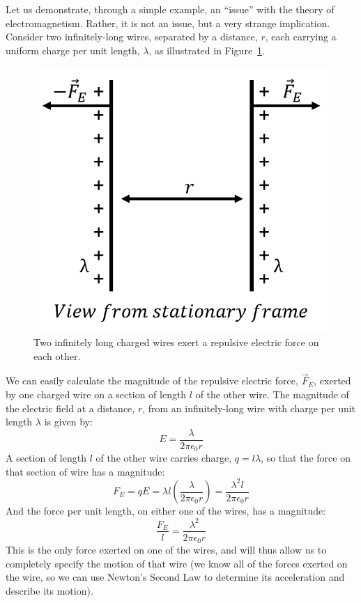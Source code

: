 Let us demonstrate, through a simple example, an ``issue'' with the theory of electromagnetism. Rather, it is not an issue, but a very strange implication. Consider two infinitely-long wires, separated by a distance, $r$, each carrying a uniform charge per unit length, $\lambda$, as illustrated in Figure~\ref{fig:specialrelativity:twowire_electric}.

\begin{figure}[!htbp]
\centering
\includegraphics[width=0.4\linewidth]{files/twowire_electric-36eb50bad6978cca806e4c1857084eb6.png}
\caption[]{Two infinitely long charged wires exert a repulsive electric force on each other.}
\label{fig:specialrelativity:twowire_electric}
\end{figure}

We can easily calculate the magnitude of the repulsive electric force, $\vec F_E$, exerted by one charged wire on a section of length $l$ of the other wire. The magnitude of the electric field at a distance, $r$, from an infinitely-long wire with charge per unit length $\lambda$ is given by:
\begin{equation}
E = \frac{\lambda}{2\pi \epsilon_0r}
\end{equation}
A section of length $l$ of the other wire carries charge, $q=l\lambda$, so that the force on that section of wire has a magnitude:
\begin{equation}
F_E=qE=\lambda l \left( \frac{\lambda}{2\pi \epsilon_0r}\right) = \frac{\lambda^2 l}{2\pi \epsilon_0r}
\end{equation}
And the force per unit length, on either one of the wires, has a magnitude:
\begin{equation}
\frac{F_E}{l}=\frac{\lambda^2}{2\pi \epsilon_0r}
\end{equation}
This is the only force exerted on one of the wires, and will thus allow us to completely specify the motion of that wire (we know all of the forces exerted on the wire, so we can use Newton's Second Law to determine its acceleration and describe its motion).

